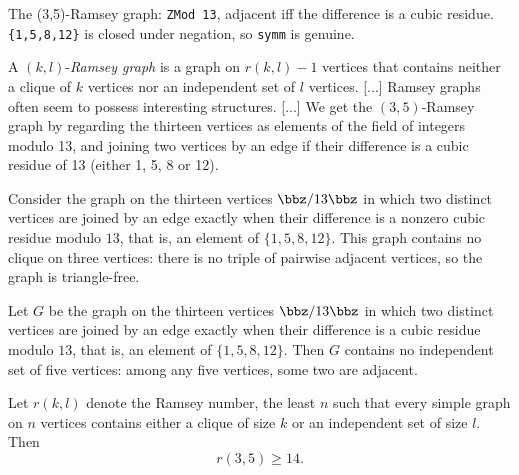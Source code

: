 \begin{definition}
\label{SimpleGraph.cubicResidueGraph13}
The (3,5)-Ramsey graph: \texttt{ZMod 13}, adjacent iff the difference is a cubic
residue. \texttt{\{1,5,8,12\}} is closed under negation, so \texttt{symm} is genuine.

A $(k, l)$-\emph{Ramsey graph} is a graph on $r(k, l) - 1$ vertices that contains
neither a clique of $k$ vertices nor an independent set of $l$ vertices. [...]
Ramsey graphs often seem to possess interesting structures. [...] We get the
$(3, 5)$-Ramsey graph by regarding the thirteen vertices as elements of the
field of integers modulo 13, and joining two vertices by an edge if their
difference is a cubic residue of 13 (either 1, 5, 8 or 12).
\end{definition}

\begin{theorem}
\label{SimpleGraph.cubicResidueGraph13_cliqueFree_three}
Consider the graph on the thirteen vertices $\bbz/13\bbz$ in which two distinct vertices
are joined by an edge exactly when their difference is a nonzero cubic residue modulo
$13$, that is, an element of $\{1,5,8,12\}$. This graph contains no clique on three
vertices: there is no triple of pairwise adjacent vertices, so the graph is
triangle-free.
\end{theorem}

\begin{theorem}
\label{SimpleGraph.cubicResidueGraph13_indepSetFree_five}
Let $G$ be the graph on the thirteen vertices $\bbz/13\bbz$ in which two distinct
vertices are joined by an edge exactly when their difference is a cubic residue modulo
$13$, that is, an element of $\{1,5,8,12\}$. Then $G$ contains no independent set of
five vertices: among any five vertices, some two are adjacent.
\end{theorem}

\begin{theorem}
\label{SimpleGraph.fourteen_le_ramseyNumber_three_five}
Let $r(k,l)$ denote the Ramsey number, the least $n$ such that every simple graph on $n$
vertices contains either a clique of size $k$ or an independent set of size $l$. Then
\[r(3,5) \ge 14.\]
\end{theorem}

